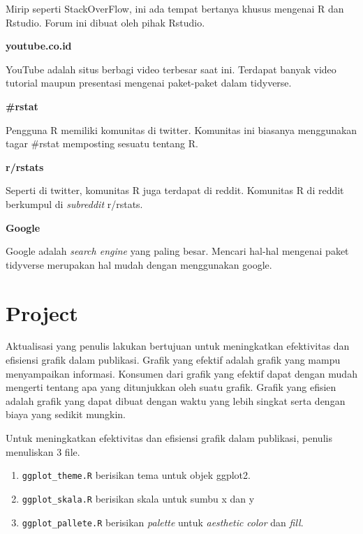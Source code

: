 \documentclass[]{book}
\begin{document}
Mirip seperti StackOverFlow, ini ada tempat bertanya khusus mengenai R
dan Rstudio. Forum ini dibuat oleh pihak Rstudio.

\textbf{youtube.co.id}

YouTube adalah situs berbagi video terbesar saat ini. Terdapat banyak
video tutorial maupun presentasi mengenai paket-paket dalam tidyverse.

\textbf{\#rstat}

Pengguna R memiliki komunitas di twitter. Komunitas ini biasanya
menggunakan tagar \#rstat memposting sesuatu tentang R.

\textbf{r/rstats}

Seperti di twitter, komunitas R juga terdapat di reddit. Komunitas R di
reddit berkumpul di \emph{subreddit} r/rstats.

\textbf{Google}

Google adalah \emph{search engine} yang paling besar. Mencari hal-hal
mengenai paket tidyverse merupakan hal mudah dengan menggunakan google.

\chapter{Project}\label{project}

Aktualisasi yang penulis lakukan bertujuan untuk meningkatkan
efektivitas dan efisiensi grafik dalam publikasi. Grafik yang efektif
adalah grafik yang mampu menyampaikan informasi. Konsumen dari grafik
yang efektif dapat dengan mudah mengerti tentang apa yang ditunjukkan
oleh suatu grafik. Grafik yang efisien adalah grafik yang dapat dibuat
dengan waktu yang lebih singkat serta dengan biaya yang sedikit mungkin.

Untuk meningkatkan efektivitas dan efisiensi grafik dalam publikasi,
penulis menuliskan 3 file.

\begin{enumerate}
\def\labelenumi{\arabic{enumi}.}
\item
  \texttt{ggplot\_theme.R} berisikan tema untuk objek ggplot2.
\item
  \texttt{ggplot\_skala.R} berisikan skala untuk sumbu x dan y
\item
  \texttt{ggplot\_pallete.R} berisikan \emph{palette} untuk
  \emph{aesthetic} \emph{color} dan \emph{fill}.
\end{enumerate}
\end{document}

